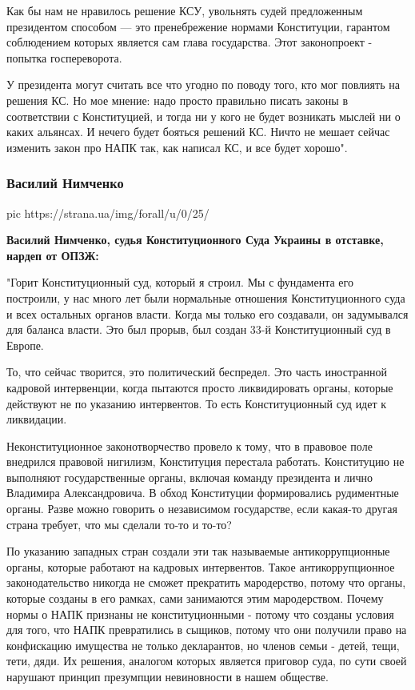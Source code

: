 Как бы нам не нравилось решение КСУ, увольнять судей предложенным президентом
способом --- это пренебрежение нормами Конституции, гарантом соблюдением которых
является сам глава государства. Этот законопроект - попытка госпереворота.

У президента могут считать все что угодно по поводу того, кто мог повлиять на
решения КС. Но мое мнение: надо просто правильно писать законы в соответствии с
Конституцией, и тогда ни у кого не будет возникать мыслей ни о каких альянсах.
И нечего будет бояться решений КС. Ничто не мешает сейчас изменить закон про
НАПК так, как написал КС, и все будет хорошо". 

\subsubsection{Василий Нимченко}

\ifcmt
	pic https://strana.ua/img/forall/u/0/25/%
\fi

{\bfseries 
Василий Нимченко, судья Конституционного Суда Украины в отставке, нардеп от ОПЗЖ:
}

"Горит Конституционный суд, который я строил. Мы с фундамента его построили, у
нас много лет были нормальные отношения Конституционного суда и всех остальных
органов власти. Когда мы только его создавали, он задумывался для баланса
власти. Это был прорыв, был создан 33-й Конституционный суд в Европе.

То, что сейчас творится, это политический беспредел. Это часть иностранной
кадровой интервенции, когда пытаются просто ликвидировать органы, которые
действуют не по указанию интервентов. То есть Конституционный суд идет к
ликвидации.

Неконституционное законотворчество провело к тому, что в правовое поле
внедрился правовой нигилизм, Конституция перестала работать. Конституцию не
выполняют государственные органы, включая команду президента и лично Владимира
Александровича. В обход Конституции формировались рудиментные органы. Разве
можно говорить о независимом государстве, если какая-то другая страна требует,
что мы сделали то-то и то-то?

По указанию западных стран создали эти так называемые антикоррупционные органы,
которые работают на кадровых интервентов. Такое антикоррупционное
законодательство никогда не сможет прекратить мародерство, потому что органы,
которые созданы в его рамках, сами занимаются этим мародерством. Почему нормы о
НАПК признаны не конституционными - потому что созданы условия для того, что
НАПК превратились в сыщиков, потому что они получили право на конфискацию
имущества не только декларантов, но членов семьи - детей, тещи, тети, дяди. Их
решения, аналогом которых является приговор суда, по сути своей нарушают
принцип презумпции невиновности в нашем обществе.


